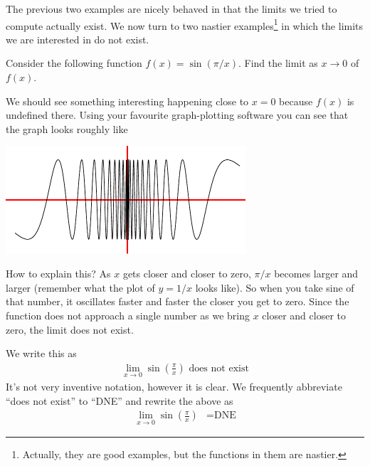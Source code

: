 The previous two examples are nicely behaved in that the limits we tried to
compute actually exist. We now turn to two nastier examples\footnote{Actually,
they are good examples, but the functions in them are nastier.} in which the
limits we are interested in do not exist.

\begin{eg}
\label{eg sinpix}
Consider the following function $f(x) = \sin( \pi /x )$. Find the limit as $x
\to 0$ of $f(x)$.

We should see something interesting happening close to $x=0$ because $f(x)$ is
undefined there. Using your favourite graph-plotting software you can see that
the graph looks roughly like
\begin{efig}
\begin{center}
 \includegraphics[height=4cm]{lim2}
\end{center}
\end{efig}
How to explain this? As $x$ gets closer and closer to zero, $\pi/x$ becomes
larger and larger (remember what the plot of $y=1/x$ looks like). So when you
take sine of that number, it oscillates faster and faster the closer you get to
zero. Since the function does not approach a single number as we bring $x$
closer and closer to zero, the limit does not exist.

We write this as
\begin{align*}
  \lim_{x\to 0} \sin \left(\frac{\pi}{x}\right) \text{ does not exist}
\end{align*}
It's not very inventive notation, however it is clear. We frequently
abbreviate ``does not exist'' to ``DNE'' and rewrite the above as
\begin{align*}
  \lim_{x\to 0} \sin \left(\frac{\pi}{x}\right) &= \text{DNE}
\end{align*}
\end{eg}


